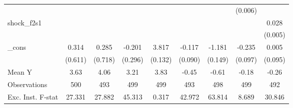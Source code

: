 {\begin{tabular}{l*{8}{c}}
            &                     &                     &                     &                     &                     &                     &     (0.006)         &                     \\
\addlinespace
shock\_f2s1  &                     &                     &                     &                     &                     &                     &                     &       0.028\sym{***}\\
            &                     &                     &                     &                     &                     &                     &                     &     (0.005)         \\
\addlinespace
\_cons      &       0.314         &       0.285         &      -0.201         &       3.817\sym{***}&      -0.117         &      -1.181\sym{***}&      -0.235\sym{**} &       0.005         \\
            &     (0.611)         &     (0.718)         &     (0.296)         &     (0.132)         &     (0.090)         &     (0.149)         &     (0.097)         &     (0.095)         \\
\midrule
Mean Y      &        3.63         &        4.06         &        3.21         &        3.83         &       -0.45         &       -0.61         &       -0.18         &       -0.26         \\
Observations&         500         &         493         &         499         &         499         &         493         &         498         &         499         &         492         \\
Exc. Inst. F-stat&      27.331         &      27.882         &      45.313         &       0.317         &      42.972         &      63.814         &       8.689         &      30.846         \\
\bottomrule
\end{tabular}
}
